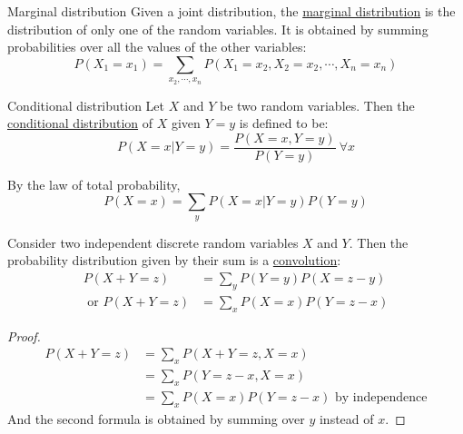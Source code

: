 \documentclass[../Main.tex]{subfiles}
\begin{document}
\begin{definition}{Marginal distribution}
    Given a joint distribution, the \underline{marginal distribution} is the distribution of only one of the random variables. It is obtained by summing probabilities over all the values of the other variables:
    \begin{equation*}
        P(X_1 = x_1) = \sum_{x_2, \cdots, x_n} P(X_1 = x_2, X_2 = x_2, \cdots, X_n = x_n)
    \end{equation*}
\end{definition}
\begin{definition}{Conditional distribution}
    Let $X$ and $Y$ be two random variables. Then the \underline{conditional distribution} of $X$ given $Y = y$ is defined to be:
    \begin{equation*}
        P(X = x | Y = y) = \frac{P(X = x, Y = y)}{P(Y = y)}~\forall x
    \end{equation*}
\end{definition}
By the law of total probability,
\begin{equation*}
    P(X = x) = \sum_y P(X = x | Y = y) P(Y = y)
\end{equation*}
\begin{proposition}[Convolutions]
    Consider two independent discrete random variables $X$ and $Y$. Then the probability distribution given by their sum is a \underline{convolution}:
    \begin{align*}
        P(X + Y = z) &= \sum_y P(Y = y) P(X = z - y) \\
        \text{ or } P(X + Y = z) &= \sum_x P(X = x) P(Y = z - x)
    \end{align*}
\end{proposition}
\begin{proof}
    \begin{align*}
        P(X + Y = z) &= \sum_x P(X + Y = z, X = x) \\
        &= \sum_x P(Y = z - x, X = x) \\
        &= \sum_x P(X = x) P(Y = z - x) \text{ by independence}
    \end{align*}
    And the second formula is obtained by summing over $y$ instead of $x$.
\end{proof}
\end{document}
